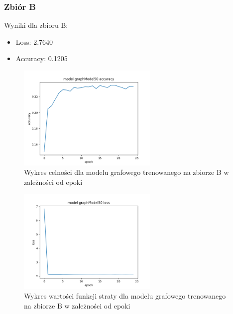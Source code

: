 \documentclass{article}
\begin{document}
\subsubsection{Zbiór B}

Wyniki dla zbioru B:
\begin{itemize}
    \item Loss: 2.7640
    \item Accuracy: 0.1205
\end{itemize}

\begin{figure}[H]
    \centering
    \includegraphics[width=0.6\textwidth]{../Saves/Graph/graphModel50_acc.png}
    \caption{Wykres celności dla modelu grafowego trenowanego na zbiorze B w zależności od epoki} 
\end{figure}

\begin{figure}[H]
    \centering
    \includegraphics[width=0.6\textwidth]{../Saves/Graph/graphModel50_loss.png}
    \caption{Wykres wartości funkcji straty dla modelu grafowego trenowanego na zbiorze B w zależności od epoki} 
\end{figure}
\end{document}
